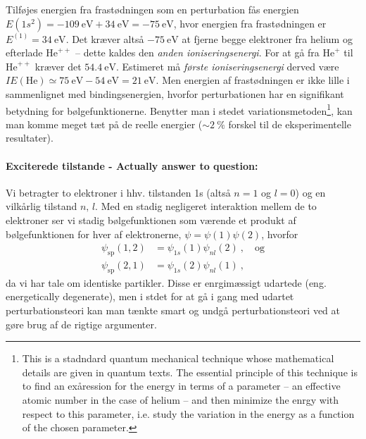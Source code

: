 Tilføjes energien fra frastødningen som en perturbation fås energien $E(1s^2) =  \SI{-109}{\eV} + \SI{34}{\eV} = \SI{-75}{\eV}$, hvor energien fra frastødningen er $E^{(1)} = \SI{34}{\eV}$. Det kræver altså $\SI{-75}{\eV}$ at fjerne begge elektroner fra helium og efterlade $\text{He}^{++}$ -- dette kaldes den \emph{anden ioniseringsenergi}. For at gå fra $\text{He}^{+}$ til $\text{He}^{++}$ kræver det $\SI{54.4}{\eV}$. Estimeret må \emph{første ioniseringsenergi} derved være $IE(\text{He}) \simeq \SI{75}{\eV} - \SI{54}{\eV} = \SI{21}{\eV}$. Men energien af frastødningen er ikke lille i sammenlignet med bindingsenergien, hvorfor perturbationen har en signifikant betydning for bølgefunktionerne. Benytter man i stedet variationsmetoden\footnote{This is a stadndard quantum mechanical technique whose mathematical details are given in quantum texts. The essential principle of this technique is to find an exåression for the energy in terms of a parameter -- an effective atomic number in the case of helium -- and then minimize the enrgy with respect to this parameter, i.e. study the variation in the energy as a function of the chosen parameter.}, kan man komme meget tæt på de reelle energier ($\sim\SI{2}{\percent}$ forskel til de eksperimentelle resultater).\\



\paragraph{Exciterede tilstande - Actually answer to question:} Vi betragter to elektroner i hhv. tilstanden 1s (altså $n=1$ og $l=0$) og en vilkårlig tilstand $n,\,l$. Med en stadig negligeret interaktion mellem de to elektroner ser vi stadig bølgefunktionen som værende et produkt af bølgefunktionen for hver af elektronerne, $\psi = \psi(1)\psi(2)$, hvorfor
\begin{align}
    \psi_\text{sp}(1,2) &= \psi_{1s}(1)\psi_{nl}(2) \: , \quad \text{og} \\
    \psi_\text{sp}(2,1) &= \psi_{1s}(2)\psi_{nl}(1) \: ,
\end{align}
da vi har tale om identiske partikler. Disse er enrgimæssigt udartede (eng. energetically degenerate), men i stdet for at gå i gang med udartet perturbationsteori kan man tænkte smart og undgå perturbationsteori ved at gøre brug af de rigtige argumenter.

